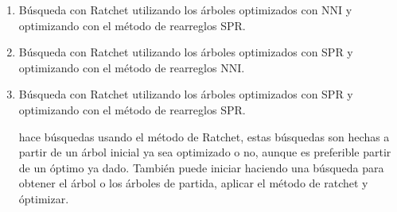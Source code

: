 \begin{itemize}
\begin{enumerate}
\item B\'usqueda con Ratchet utilizando los \'arboles optimizados con NNI y optimizando con el m\'etodo de rearreglos SPR.



\item B\'usqueda con Ratchet utilizando los \'arboles optimizados con SPR y optimizando con el m\'etodo de rearreglos NNI.


\item B\'usqueda con Ratchet utilizando los \'arboles optimizados con SPR y optimizando con el m\'etodo de rearreglos SPR.



 hace b\'usquedas usando el m\'etodo de Ratchet, estas b\'usquedas son hechas a partir de un \'arbol inicial ya sea optimizado o no,  aunque es preferible partir de un \'optimo ya dado. Tambi\'en puede iniciar haciendo una b\'usqueda para obtener el \'arbol o los \'arboles de partida, aplicar el m\'etodo de ratchet y \'optimizar.


\end{enumerate}



\end{itemize}
